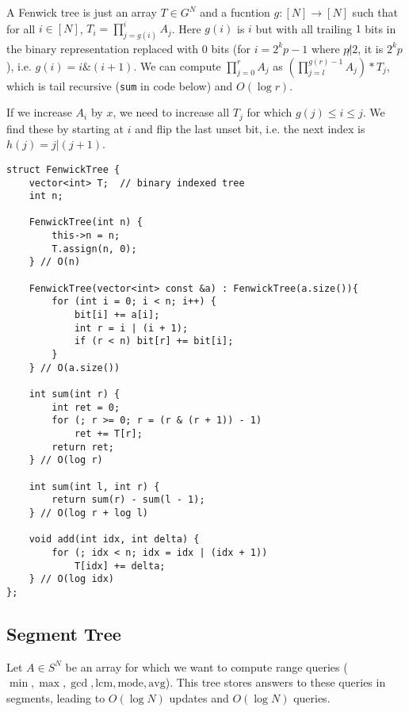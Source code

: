 \documentclass[11pt]{amsart}
\newcommand{\ra}{\rightarrow}
\begin{document}
A Fenwick tree is just an array $T\in G^N$ and a fucntion $g: [N]\ra[N]$ such that for all $i \in [N]$,
$T_i = \prod_{j=g(i)}^i A_j$. Here $g(i)$ is $i$ but with all trailing $1$ bits in the binary representation replaced with $0$ bits (for $i = 2^kp - 1$ where $p\not | 2$, it is $2^kp$), i.e. $g(i) = i \& (i+1)$. We can compute $\prod_{j=0}^r A_j$ as  $\left(\prod_{j=l}^{g(r)-1}A_j\right) * T_j$, which is tail recursive (\verb|sum| in code below) and $O(\log r)$.

If we increase $A_i$ by $x$, we need to increase all $T_j$ for which $g(j) \leq i \leq j$. We find these by starting at $i$ and flip the last unset bit, i.e. the next index is $h(j) = j|(j+1)$.

\begin{verbatim}
struct FenwickTree {
    vector<int> T;  // binary indexed tree
    int n;

    FenwickTree(int n) {
        this->n = n;
        T.assign(n, 0);
    } // O(n)

    FenwickTree(vector<int> const &a) : FenwickTree(a.size()){
        for (int i = 0; i < n; i++) {
            bit[i] += a[i];
            int r = i | (i + 1);
            if (r < n) bit[r] += bit[i];
        } 
    } // O(a.size())

    int sum(int r) {
        int ret = 0;
        for (; r >= 0; r = (r & (r + 1)) - 1)
            ret += T[r];
        return ret;
    } // O(log r)

    int sum(int l, int r) {
        return sum(r) - sum(l - 1);
    } // O(log r + log l)

    void add(int idx, int delta) {
        for (; idx < n; idx = idx | (idx + 1))
            T[idx] += delta;
    } // O(log idx)
};

\end{verbatim}

\subsection{Segment Tree}

Let $A\in S^N$ be an array for which we want to compute range queries ($\min, \max, \gcd, \text{lcm}, \text{mode}, \text{avg}$). This tree stores answers to these queries in segments, leading to $O(\log N)$ updates and $O(\log N)$ queries.
\end{document}
